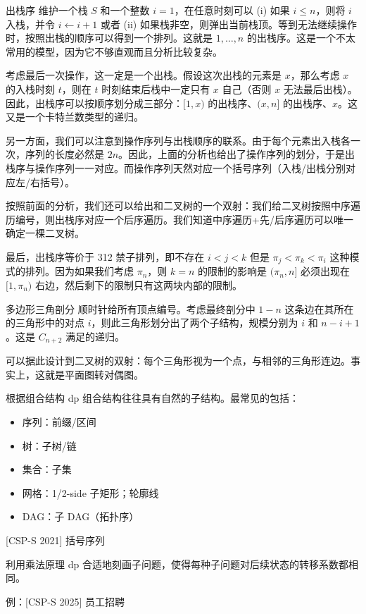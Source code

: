\begin{frame}{出栈序}
    维护一个栈 $S$ 和一个整数 $i=1$，在任意时刻可以 (i) 如果 $i\le n$，则将 $i$ 入栈，并令 $i\gets i+1$ 或者 (ii) 如果栈非空，则弹出当前栈顶。等到无法继续操作时，按照出栈的顺序可以得到一个排列。这就是 $1,\ldots,n$ 的出栈序。这是一个不太常用的模型，因为它不够直观而且分析比较复杂。
    
    考虑最后一次操作，这一定是一个出栈。假设这次出栈的元素是 $x$，那么考虑 $x$ 的入栈时刻 $t$，则在 $t$ 时刻结束后栈中一定只有 $x$ 自己（否则 $x$ 无法最后出栈）。因此，出栈序可以按顺序划分成三部分：$[1,x)$ 的出栈序、$(x,n]$ 的出栈序、$x$。这又是一个卡特兰数类型的递归。

    另一方面，我们可以注意到操作序列与出栈顺序的联系。由于每个元素出入栈各一次，序列的长度必然是 $2n$。因此，上面的分析也给出了操作序列的划分，于是出栈序与操作序列一一对应。而操作序列天然对应一个括号序列（入栈/出栈分别对应左/右括号）。
\end{frame}
\begin{frame}
    按照前面的分析，我们还可以给出和二叉树的一个双射：我们给二叉树按照中序遍历编号，则出栈序对应一个后序遍历。我们知道中序遍历+先/后序遍历可以唯一确定一棵二叉树。

    最后，出栈序等价于 312 禁子排列，即不存在 $i<j<k$ 但是 $\pi_j<\pi_k<\pi_i$ 这种模式的排列。因为如果我们考虑 $\pi_n$，则 $k=n$ 的限制的影响是 $(\pi_n,n]$ 必须出现在 $[1,\pi_n)$ 右边，然后剩下的限制只有这两块内部的限制。
\end{frame}
\begin{frame}{多边形三角剖分}
    顺时针给所有顶点编号。考虑最终剖分中 $1-n$ 这条边在其所在的三角形中的对点 $i$，则此三角形划分出了两个子结构，规模分别为 $i$ 和 $n-i+1$。这是 $C_{n+2}$ 满足的递归。

    可以据此设计到二叉树的双射：每个三角形视为一个点，与相邻的三角形连边。事实上，这就是平面图转对偶图。
\end{frame}
\begin{frame}{根据组合结构 dp}
    组合结构往往具有自然的子结构。最常见的包括：

    \begin{itemize}
        \item 序列：前缀/区间
        \item 树：子树/链
        \item 集合：子集
        \item 网格：1/2-side 子矩形；轮廓线
        \item DAG：子 DAG（拓扑序）
    \end{itemize}
\end{frame}
\begin{frame}{[CSP-S 2021] 括号序列}
\end{frame}
\begin{frame}{利用乘法原理 dp}
    合适地刻画子问题，使得每种子问题对后续状态的转移系数都相同。

    例：[CSP-S 2025] 员工招聘
\end{frame}

